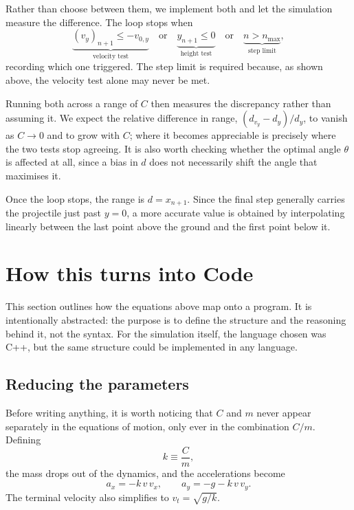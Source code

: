\documentclass[11pt]{article}
\begin{document}
Rather than choose between them, we implement both and let the
simulation measure the difference. The loop stops when
\begin{equation}
    \underbrace{(v_y)_{n+1} \leq -v_{0,y}}_{\text{velocity test}}
    \quad\text{or}\quad
    \underbrace{y_{n+1} \leq 0}_{\text{height test}}
    \quad\text{or}\quad
    \underbrace{n > n_{\max}}_{\text{step limit}} ,
\end{equation}
recording which one triggered. The step limit is required because, as
shown above, the velocity test alone may never be met.

Running both across a range of $C$ then measures the discrepancy
rather than assuming it. We expect the relative difference in range,
$(d_{v_y} - d_y)/d_y$, to vanish as $C \to 0$ and to grow with $C$;
where it becomes appreciable is precisely where the two tests stop
agreeing. It is also worth checking whether the optimal angle
$\theta$ is affected at all, since a bias in $d$ does not necessarily
shift the angle that maximises it.

Once the loop stops, the range is $d = x_{n+1}$. Since the final step
generally carries the projectile just past $y = 0$, a more accurate
value is obtained by interpolating linearly between the last point
above the ground and the first point below it.

\section{How this turns into Code}

This section outlines how the equations above map onto a program. It
is intentionally abstracted: the purpose is to define the structure 
and the reasoning behind it, not the syntax. For the simulation itself,
the language chosen was C++, but the same structure could be implemented 
in any language.

\subsection{Reducing the parameters}

Before writing anything, it is worth noticing that $C$ and $m$ never
appear separately in the equations of motion, only ever in the
combination $C/m$. Defining
\begin{equation}
    k \equiv \frac{C}{m},
\end{equation}
the mass drops out of the dynamics, and the accelerations
become
\begin{equation}
    a_x = -k\,v\,v_x, \qquad a_y = -g - k\,v\,v_y .
    \label{eq:accel_k}
\end{equation}
The terminal velocity also simplifies to $v_t = \sqrt{g/k}$.
\end{document}
